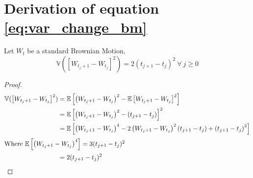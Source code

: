 \documentclass[../TGMAFFIRO]{subfiles}
\begin{document}
  \section{Derivation of equation \ref{eq:var_change_bm}} \label{proof:var_change_bm}
  \begin{proposition}
  Let $W_t$ be a standard Brownian Motion, 
  \begin{equation*}
  	\mathbb{V}(\left[W_{t_j+1} - W_{t_j}\right]^2) = 2\left(t_{j+1} - t_j\right)^2 \ \forall \ j \geq 0 
  \end{equation*}
  
  \begin{proof}
  \begin{align*}
  	\mathbb{V}(\left[W_{t_j+1} - W_{t_j}\right]^2) &= \mathbb{E}\left[\left(W_{t_j+1} - W_{t_j}\right)^2 - \mathbb{E}\left[W_{t_j+1} - W_{t_j}\right]^2\right] \\
  	&= \mathbb{E}\left[\left(W_{t_j+1} - W_{t_j}\right)^2 -\left(t_{j+1} - t_j\right)\right]^2 \\
  	&= \mathbb{E}\left[\left(W_{t_j+1} - W_{t_j}\right)^4  - 2\left(W_{t_j+1} - W_{t_j}\right)^2 \left(t_{j+1} - t_j\right) + \left(t_{j+1} - t_j\right)^2\right] \\
  	\intertext{Where $\mathbb{E}\left[\left(W_{t_j+1} - W_{t_j}\right)^4\right] = 3(t_{j+1} - t_j)^2$}
   	&= 2(t_{j+1} - t_j)^2
  \end{align*}
  \end{proof}
  \end{proposition}
\end{document}
